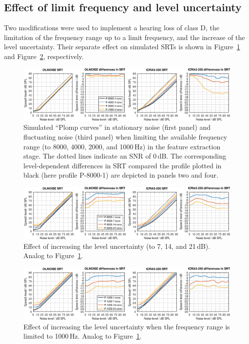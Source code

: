 \documentclass[10pt,a4paper,twocolumn]{article}
\begin{document}
\subsection*{Effect of limit frequency and level uncertainty}
%
Two modifications were used to implement a hearing loss of class D, the limitation of the frequency range up to a limit frequency, and the increase of the level uncertainty.
%
Their separate effect on simulated SRTs is shown in Figure~\ref{fig:11} and Figure~\ref{fig:12}, respectively.
%
\begin{figure}[h!]
	\centerline{\includegraphics[width=\textwidth]{images/SRTs-frequencyrange}}
	\caption{Simulated \enquote{Plomp curves} in stationary noise (first panel) and fluctuating noise (third panel) when limiting the available frequency range (to 8000, 4000, 2000, and 1000\,Hz) in the feature extraction stage.
	The dotted lines indicate an SNR of 0\,dB.
	The corresponding level-dependent differences in SRT compared the profile plotted in black (here profile P-8000-1) are depicted in panels two and four.
	}
	\label{fig:11}
\end{figure}
%
\begin{figure}[h!]
	\centerline{\includegraphics[width=\textwidth]{images/SRTs-leveluncertainty}}
	\caption{Effect of increasing the level uncertainty (to 7, 14, and 21\,dB). Analog to Figure~\ref{fig:11}.}
	\label{fig:12}
\end{figure}
%
\begin{figure}[h!]
	\centerline{\includegraphics[width=\textwidth]{images/SRTs-leveluncertainty-with-frequencyrange}}
	\caption{Effect of increasing the level uncertainty when the frequency range is limited to 1000\,Hz. Analog to Figure~\ref{fig:11}.}
	\label{fig:13}
\end{figure}
\end{document}
